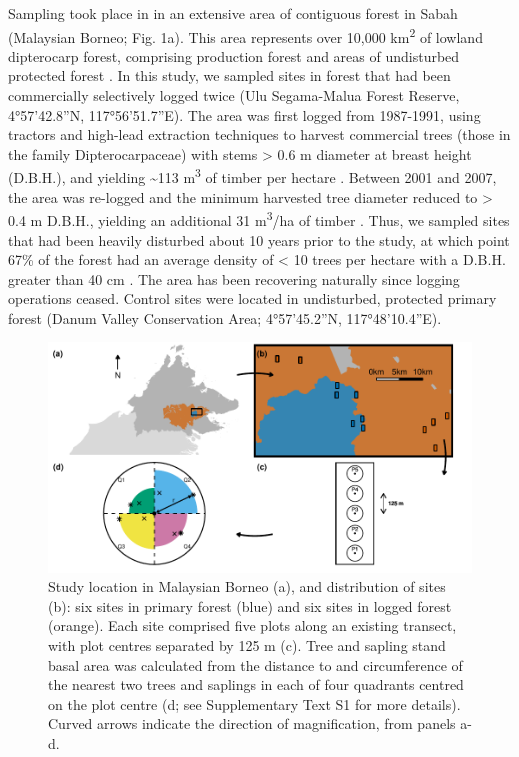\documentclass[12pt,a4paper,]{report}
\theoremstyle{definition}
\theoremstyle{definition}
\theoremstyle{definition}
\theoremstyle{remark}
\begin{document}
Sampling took place in in an extensive area of contiguous forest in
Sabah (Malaysian Borneo; Fig. 1a). This area represents over 10,000
km\textsuperscript{2} of lowland dipterocarp forest, comprising
production forest and areas of undisturbed protected forest
\citep{reynolds_changes2011}. In this study, we sampled sites in forest
that had been commercially selectively logged twice (Ulu Segama-Malua
Forest Reserve, 4°57'42.8''N, 117°56'51.7''E). The area was first logged
from 1987-1991, using tractors and high-lead extraction techniques to
harvest commercial trees (those in the family Dipterocarpaceae) with
stems \textgreater{} 0.6 m diameter at breast height (D.B.H.), and
yielding \textasciitilde{}113 m\textsuperscript{3} of timber per hectare
\citep{fisher_cost-effective2011, edwards_selective-logging2014}.
Between 2001 and 2007, the area was re-logged and the minimum harvested
tree diameter reduced to \textgreater{} 0.4 m D.B.H., yielding an
additional 31 m\textsuperscript{3}/ha of timber
\citep{fisher_cost-effective2011}. Thus, we sampled sites that had been
heavily disturbed about 10 years prior to the study, at which point 67\%
of the forest had an average density of \textless{} 10 trees per hectare
with a D.B.H. greater than 40 cm \citep{reynolds_changes2011}. The area
has been recovering naturally since logging operations ceased. Control
sites were located in undisturbed, protected primary forest (Danum
Valley Conservation Area; 4°57'45.2''N, 117°48'10.4''E).

\begin{figure}

{\centering \includegraphics{./output/fig-4-1-1} 

}

\caption{Study location in Malaysian Borneo (a), and distribution of sites (b): six sites in primary forest (blue) and six sites in logged forest (orange). Each site comprised five plots along an existing transect, with plot centres separated by 125 m (c). Tree and sapling stand basal area was calculated from the distance to and circumference of the nearest two trees and saplings in each of four quadrants centred on the plot centre (d; see Supplementary Text S1 for more details). Curved arrows indicate the direction of magnification, from panels a-d.}\label{fig:fig-4-1}
\end{figure}
\end{document}
